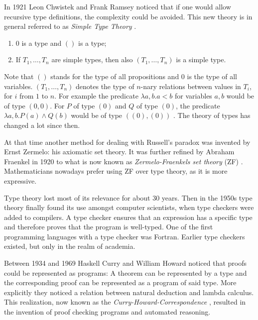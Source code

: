 \documentclass[]{scrbook}
\theoremstyle{definition}
\theoremstyle{definition}
\theoremstyle{definition}
\theoremstyle{remark}
\let\BeginKnitrBlock\begin \let\EndKnitrBlock\end
\begin{document}
In 1921 Leon Chwistek and Frank Ramsey noticed that if one would allow
recursive type definitions, the complexity could be avoided. This new
theory is in general referred to as \emph{Simple Type Theory}
\autocite{modern_perspective_on_type_theory}.

\BeginKnitrBlock{definition}[Simple Type Theory]
\protect\hypertarget{def:unnamed-chunk-2}{}{\label{def:unnamed-chunk-2}
{} }\label{thm:simple_type_theory}

\begin{enumerate}
\item $0$ is a type and $()$ is a type;
\item If $T_1,\dots,T_n$ are simple types, then also $(T_1, \dots, T_n)$ is a simple type.
\end{enumerate}
\EndKnitrBlock{definition}

Note that \(()\) stands for the type of all propositions and \(0\) is
the type of all variables. \((T_1, \dots, T_n)\) denotes the type of
\(n\)-nary relations between values in \(T_i\), for \(i\) from \(1\) to
\(n\). For example the predicate \(\lambda a,b. a < b\) for variables
\(a,b\) would be of type \((0,0)\). For \(P\) of type \((0)\) and \(Q\)
of type \((0)\), the predicate \(\lambda a,b. P(a) \land Q(b)\) would be
of type \(((0),(0))\) \autocite{modern_perspective_on_type_theory}. The
theory of types has changed a lot since then.

At that time another method for dealing with Russell's paradox was
invented by Ernst Zermelo: his axiomatic set theory. It was further
refined by Abraham Fraenkel in 1920 to what is now known as
\emph{Zermelo-Fraenkels set theory} (ZF)
\autocite{modern_perspective_on_type_theory}. Mathematicians nowadays
prefer using ZF over type theory, as it is more expressive.

Type theory lost most of its relevance for about 30 years. Then in the
1950s type theory finally found its use amongst computer scientists,
when type checkers were added to compilers. A type checker ensures that
an expression has a specific type and therefore proves that the program
is well-typed. One of the first programming languages with a type
checker was Fortran. Earlier type checkers existed, but only in the
realm of academia.

Between 1934 and 1969 Haskell Curry and William Howard noticed that
proofs could be represented as programs: A theorem can be represented by
a type and the corresponding proof can be represented as a program of
said type. More explicitly they noticed a relation between natural
deduction and lambda calculus. This realization, now known as the
\emph{Curry-Howard-Correspondence}
\autocite{modern_perspective_on_type_theory}, resulted in the invention
of proof checking programs and automated reasoning.
\end{document}
